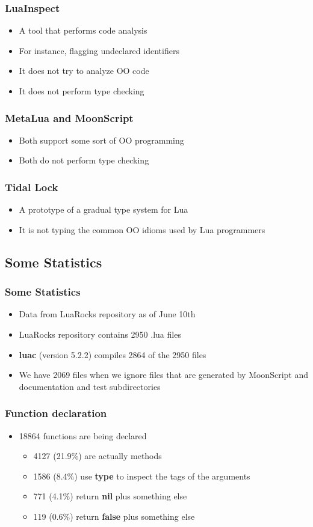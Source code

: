 \documentclass{beamer}
\begin{document}
\begin{frame}
\frametitle{LuaInspect}
\begin{itemize}
\item A tool that performs code analysis
\item For instance, flagging undeclared identifiers
\item It does not try to analyze OO code
\item It does not perform type checking
\end{itemize}
\end{frame}

\begin{frame}
\frametitle{MetaLua and MoonScript}
\begin{itemize}
\item Both support some sort of OO programming
\item Both do not perform type checking
\end{itemize}
\end{frame}

\begin{frame}
\frametitle{Tidal Lock}
\begin{itemize}
\item A prototype of a gradual type system for Lua
\item It is not typing the common OO idioms used by Lua programmers
\end{itemize}
\end{frame}

\subsection{Some Statistics}
\begin{frame}
\frametitle{Some Statistics}
\begin{itemize}
\item Data from LuaRocks repository as of June 10th
\item LuaRocks repository contains 2950 .lua files
\item \textbf{luac} (version 5.2.2) compiles 2864 of the 2950 files
\item We have 2069 files when we ignore files that are generated by
MoonScript and documentation and test subdirectories
\end{itemize}
\end{frame}

\begin{frame}
\frametitle{Function declaration}
\begin{itemize}
\item 18864 functions are being declared
\begin{itemize}
\item 4127 (21.9\%) are actually methods
\item 1586 (8.4\%) use \textbf{type} to inspect the tags of the arguments
\item 771 (4.1\%) return \textbf{nil} plus something else
\item 119 (0.6\%) return \textbf{false} plus something else
\end{itemize}
\end{itemize}
\end{frame}
\end{document}

